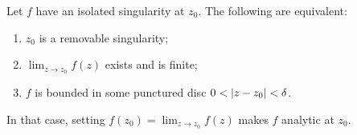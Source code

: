 \begin{theorem}\label{thm:removable}
  Let $f$ have an isolated singularity at $z_0$. The following are equivalent:
  \begin{enumerate}[label=(\roman*)]
    \item $z_0$ is a removable singularity;
    \item $\lim_{z \to z_0} f(z)$ exists and is finite;
    \item $f$ is bounded in some punctured disc $0 < \lvert z - z_0\rvert < \delta$.
  \end{enumerate}
  In that case, setting $f(z_0) = \lim_{z \to z_0} f(z)$ makes $f$ analytic at
  $z_0$.
\end{theorem}

